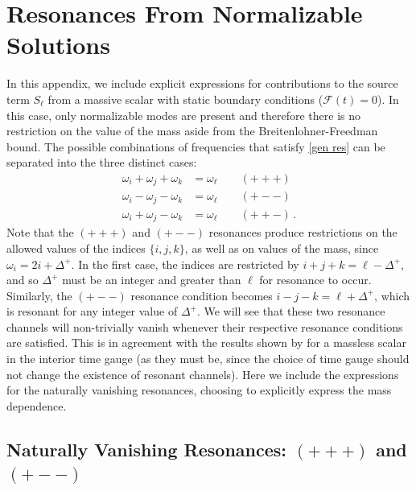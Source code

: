 \documentclass[letterpaper,11pt]{article}
\newcommand{\oi}{\omega_i}
\newcommand{\oj}{\omega_j}
\newcommand{\ok}{\omega_k}
\newcommand{\ol}{\omega_\ell}
\newcommand{\mc}{\mathcal}
\begin{document}

\section{Resonances From Normalizable Solutions}
\label{sec: norm res}
In this appendix, we include explicit expressions for contributions to the source term $S_\ell$ from a massive scalar with static boundary conditions ($\mc F(t) = 0$). In this case, only normalizable modes are present and therefore there is no restriction on the value of the mass aside from the Breitenlohner-Freedman bound. The possible combinations of frequencies that satisfy \eqref{gen res} can be separated into the three distinct cases:
\begin{align}
\oi + \oj + \ok &= \ol \qquad (+++) \\
\oi - \oj - \ok &= \ol \qquad (+--) \\
\oi + \oj - \ok &= \ol \qquad (++-) \, .
\end{align}
Note that the $(+++)$ and $(+--)$ resonances produce restrictions on the allowed values of the indices $\{i, j, k\}$, as well as on values of the mass, since $\oi = 2 i + \Delta^+$. In the first case, the indices are restricted by ${i + j + k = \ell - \Delta^+}$, and so $\Delta^+$ must be an integer and greater than $\ell$ for resonance to occur. Similarly, the $(+--)$ resonance condition becomes ${i - j - k = \ell + \Delta^+}$, which is resonant for any integer value of $\Delta^+$. We will see that these two resonance channels will non-trivially vanish whenever their respective resonance conditions are satisfied. This is in agreement with the results shown by \cite{1407.6273} for a massless scalar in the interior time gauge (as they must be, since the choice of time gauge should not change the existence of resonant channels). Here we include the expressions for the naturally vanishing resonances, choosing to explicitly express the mass dependence. 


\subsection{Naturally Vanishing Resonances: $(+++)$ and $(+--)$}
\label{ssec: zero resonance}
\end{document}
